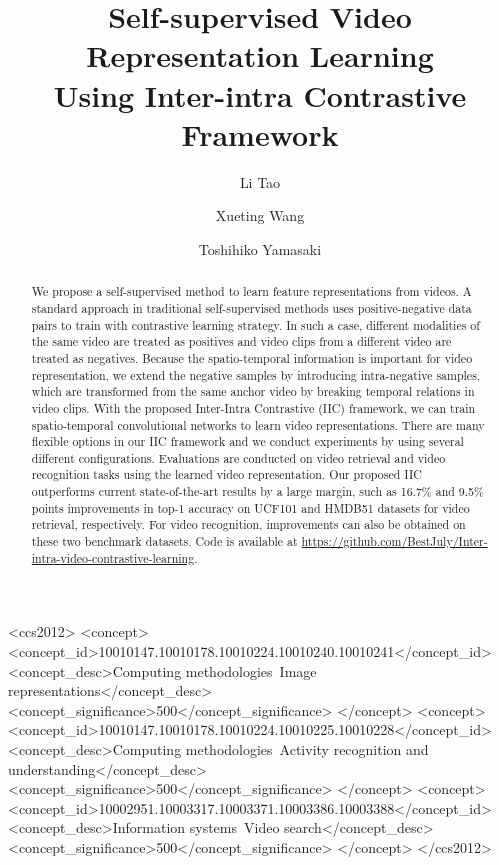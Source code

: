 \documentclass[sigconf]{acmart}
\begin{document}
\fancyhead{}

\title{Self-supervised Video Representation Learning \\ Using Inter-intra Contrastive Framework}

\author{Li Tao}

\author{Xueting Wang}

\author{Toshihiko Yamasaki}

\renewcommand{\shortauthors}{Tao, Wang and Yamasaki.}

\begin{abstract}
We propose a self-supervised method to learn feature representations from videos. A standard approach in traditional self-supervised methods uses positive-negative data pairs to train with contrastive learning strategy. In such a case, different modalities of the same video are treated as positives and video clips from a different video are treated as negatives. Because the spatio-temporal information is important for video representation, we extend the negative samples by introducing intra-negative samples, which are transformed from the same anchor video by breaking temporal relations in video clips. With the proposed Inter-Intra Contrastive (IIC) framework, we can train spatio-temporal convolutional networks to learn video representations. There are many flexible options in our IIC framework and we conduct experiments by using several different configurations. Evaluations are conducted on video retrieval and video recognition tasks using the learned video representation. Our proposed IIC outperforms current state-of-the-art results by a large margin, such as 16.7\% and 9.5\% points improvements in top-1 accuracy on UCF101 and HMDB51 datasets for video retrieval, respectively. For video recognition, improvements can also be obtained on these two benchmark datasets. 
Code is available at \url{https://github.com/BestJuly/Inter-intra-video-contrastive-learning}.
\end{abstract}

\begin{CCSXML}
<ccs2012>
<concept>
<concept_id>10010147.10010178.10010224.10010240.10010241</concept_id>
<concept_desc>Computing methodologies~Image representations</concept_desc>
<concept_significance>500</concept_significance>
</concept>
<concept>
<concept_id>10010147.10010178.10010224.10010225.10010228</concept_id>
<concept_desc>Computing methodologies~Activity recognition and understanding</concept_desc>
<concept_significance>500</concept_significance>
</concept>
<concept>
<concept_id>10002951.10003317.10003371.10003386.10003388</concept_id>
<concept_desc>Information systems~Video search</concept_desc>
<concept_significance>500</concept_significance>
</concept>
</ccs2012>
\end{CCSXML}
\end{document}
